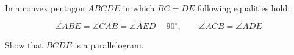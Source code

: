 In a convex pentagon $ ABCDE$ in which $ BC=DE$ following equalities hold:

\[ \angle ABE =\angle CAB =\angle AED-90^{\circ},\qquad \angle ACB=\angle ADE\]

Show that $ BCDE$ is a parallelogram.